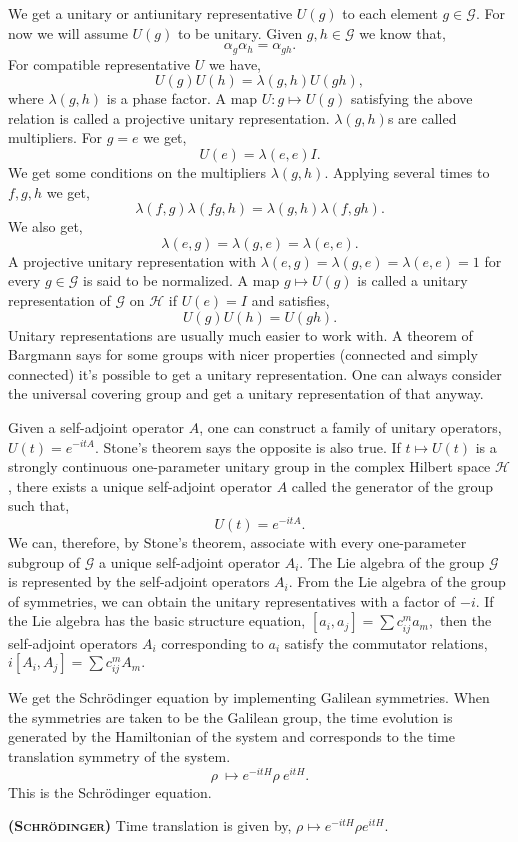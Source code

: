 \documentclass[11pt]{report}
\begin{document}
We get a unitary or antiunitary representative $U(g)$ to each element $g\in\mathcal{G}$. For now we will assume $U(g)$ to be unitary. Given $g,h\in \mathcal{G}$ we know that,
$$\alpha_g\alpha_h=\alpha_{gh}.$$
For compatible representative $U$ we have, 
$$ U(g)U(h)=\lambda (g,h)U(gh),$$
where $\lambda (g,h)$ is a phase factor. A map $U:g \mapsto U(g)$ satisfying the above relation is called a projective unitary representation. $\lambda (g,h)$s are called multipliers. For $g=e$ we get,
$$U(e)=\lambda(e,e)I.$$
We get some conditions on the multipliers $\lambda (g,h)$. Applying several times to $f,g,h$ we get,
$$\lambda (f,g)\lambda (fg,h)=\lambda (g,h)\lambda (f,gh).$$
We also get,
$$\lambda(e,g)=\lambda(g,e)=\lambda(e,e).$$
A projective unitary representation with $\lambda(e,g)=\lambda(g,e)=\lambda(e,e)=1$ for every $g\in\mathcal{G}$ is said to be normalized. A map $g\mapsto U(g)$ is called a unitary representation of $\mathcal{G}$ on $\mathcal{H}$ if $U(e)=I$ and satisfies,
$$ U(g)U(h)=U(gh).$$
Unitary representations are usually much easier to work with. A theorem of Bargmann says for some groups with nicer properties (connected and simply connected) it's possible to get a unitary representation. One can always consider the universal covering group and get a unitary representation of that anyway.

Given a self-adjoint operator $A$, one can construct a family of unitary operators, $U(t)=e^{-itA}$. Stone's theorem says the opposite is also true. If $t\mapsto U(t)$ is a strongly continuous one-parameter unitary group in the complex Hilbert space $\mathcal{H}$, there exists a unique self-adjoint operator $A$ called the generator of the group such that, 
$$U(t)=e^{-itA}.$$
We can, therefore, by Stone's theorem, associate with every one-parameter subgroup of $\mathcal{G}$ a unique self-adjoint operator $A_i$. The Lie algebra of the group $\mathcal{G}$ is represented by the self-adjoint operators $A_i$. From the Lie algebra of the group of symmetries, we can obtain the unitary representatives with a factor of $-i$. If the Lie algebra has the basic structure equation, $[a_i,a_j]=\sum c_{ij}^m a_m,$ then the self-adjoint operators $A_i$ corresponding to $a_i$ satisfy the commutator relations, $i[A_i,A_j]=\sum c_{ij}^m A_m.$

We get the Schr\"odinger equation by implementing Galilean symmetries. When the symmetries are taken to be the Galilean group, the time evolution is generated by the Hamiltonian of the system and corresponds to the time translation symmetry of the system.
$$\rho\:\mapsto e^{-itH}\rho \:e^{itH}.$$
This is the Schr\"odinger equation.
\label{section:Schrodinger}
\vspace{1em}
\begin{postulate}
	{\bfseries{\textsc{(Schr\"odinger)}}} Time translation is given by, $\rho\mapsto e^{-itH}\rho e^{itH}.$
\end{postulate}
\vspace{1em}
\end{document}
